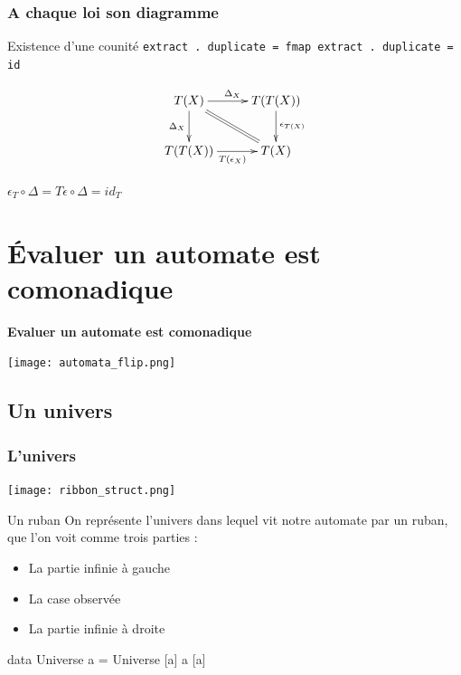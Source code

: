 \documentclass{beamer}
\begin{document}
\begin{frame}
\frametitle{A chaque loi son diagramme}
\begin{alertblock}{Existence d'une counité}
\verb!extract . duplicate = fmap extract . duplicate = id!
\end{alertblock}

\begin{block}{}
\[
\xymatrix{
T(X) \ar[d]_{\Delta_X} \ar[r]^{\Delta_X}  \ar@{=}[dr] & T(T(X))   \ar[d]^{\epsilon_{T(X)}} \\
T(T(X)) \ar[r]_{T(\epsilon_X)} & T(X) \\
}
\]
\end{block}

\begin{block}{}
\begin{center}
$\epsilon_T \circ \Delta = T \epsilon \circ \Delta = id_T$
\end{center}
\end{block}

\end{frame}

\section{Évaluer un automate est comonadique}

\begin{frame}
\begin{center}
\textbf{ Evaluer un automate est comonadique }
\end{center}
\begin{center}
\texttt{[image: automata\_flip.png]}
\end{center}
\end{frame}

\subsection{Un univers}
\begin{frame}
\frametitle{L'univers}
\begin{center}
\texttt{[image: ribbon\_struct.png]}
\end{center}

\begin{block}{Un ruban}
On représente l'univers dans lequel vit notre automate par un ruban, que l'on voit comme trois parties :

\begin{itemize}
\item La partie infinie à gauche
\item La case observée
\item La partie infinie à droite
\end{itemize}
\end{block}

\begin{block}{}
data Universe a = Universe [a] a [a]
\end{block}
\end{frame}
\end{document}
